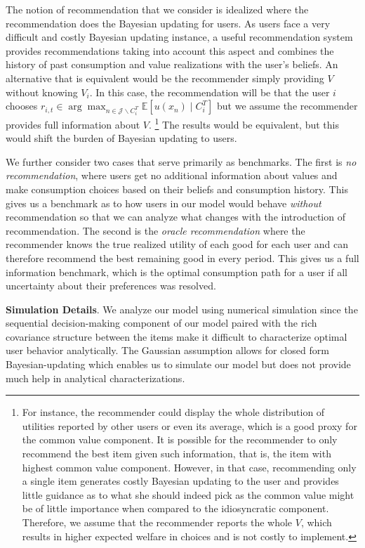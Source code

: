 \documentclass[sigconf]{acmart}
\begin{document}
The notion of recommendation that we consider is idealized where the recommendation does the Bayesian updating for users. As users face a very difficult and costly Bayesian updating instance, a useful recommendation system provides recommendations taking into account this aspect and combines the history of past consumption and value realizations with the user's beliefs. 
An alternative that is equivalent would be the recommender simply providing $V$ without knowing $V_i$. In this case, the recommendation will be that the user $i$ chooses $r_{i,t} \in \arg \max_{n\in \mathcal J\backslash C^T_i} \mathbb E[u(x_n) \mid C_i^T]$
but we assume the recommender provides full information about $V$. \footnote{For instance, the recommender could display the whole distribution of utilities reported by other users or even its average, which is a good proxy for the common value component. It is possible for the recommender to only recommend the best item given such information, that is, the item with highest common value component. However, in that case, recommending only a single item generates costly Bayesian updating to the user and provides little guidance as to what she should indeed pick as the common value might be of little importance when compared to the idiosyncratic component. Therefore, we assume that the recommender reports the whole $V$, which results in higher expected welfare in choices and is not costly to implement.}
The results would be equivalent, but this would shift the burden of Bayesian updating to users.
\par

We further consider two cases that serve primarily as benchmarks. The first is \textit{no recommendation}, where users get no additional information about values and make consumption choices based on their beliefs and consumption history. This gives us a benchmark as to how users in our model would behave \textit{without} recommendation so that we can analyze what changes with the introduction of recommendation. The second is the \textit{oracle recommendation} where the recommender knows the true realized utility of each good for each user and can therefore recommend the best remaining good in every period. This gives us a full information benchmark, which is the optimal consumption path for a user if all uncertainty about their preferences was resolved.
\par

\noindent \textbf{Simulation Details}. 
We analyze our model using numerical simulation since the sequential decision-making component of our model paired with the rich covariance structure between the items make it difficult to characterize optimal user behavior analytically. The Gaussian assumption allows for closed form Bayesian-updating which enables us to simulate our model but does not provide much help in analytical characterizations. 
\par
\end{document}

